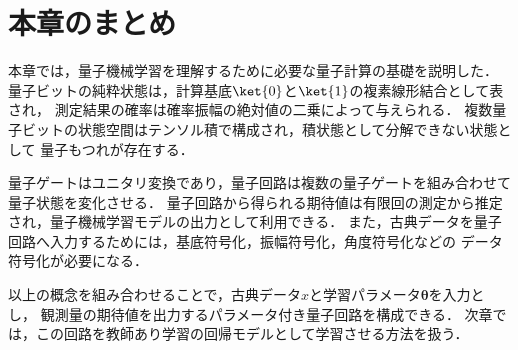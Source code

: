 \section{本章のまとめ}
\label{sec:quantum-basics-summary}

本章では，量子機械学習を理解するために必要な量子計算の基礎を説明した．
量子ビットの純粋状態は，計算基底$\ket{0}$と$\ket{1}$の複素線形結合として表され，
測定結果の確率は確率振幅の絶対値の二乗によって与えられる．
複数量子ビットの状態空間はテンソル積で構成され，積状態として分解できない状態として
量子もつれが存在する．

量子ゲートはユニタリ変換であり，量子回路は複数の量子ゲートを組み合わせて量子状態を変化させる．
量子回路から得られる期待値は有限回の測定から推定され，量子機械学習モデルの出力として利用できる．
また，古典データを量子回路へ入力するためには，基底符号化，振幅符号化，角度符号化などの
データ符号化が必要になる．

以上の概念を組み合わせることで，古典データ$x$と学習パラメータ$\bm{\theta}$を入力とし，
観測量の期待値を出力するパラメータ付き量子回路を構成できる．
次章では，この回路を教師あり学習の回帰モデルとして学習させる方法を扱う．

